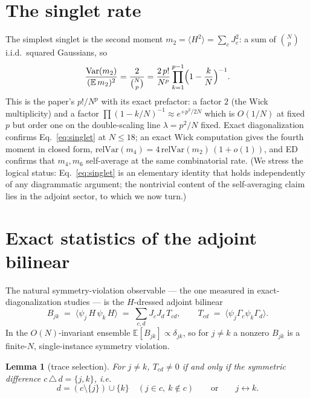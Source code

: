 \documentclass[11pt]{article}
\newtheorem{lemma}{Lemma}
\newcommand{\Var}{\operatorname{Var}}
\begin{document}
\section{The singlet rate}

The simplest singlet is the second moment
$m_2=\langle H^2\rangle=\sum_c J_c^2$: a sum of $\binom{N}{p}$ i.i.d.\
squared Gaussians, so
\begin{equation}
\frac{\Var(m_2)}{(\mathbb E\,m_2)^2}=\frac{2}{\binom{N}{p}}
=\frac{2\,p!}{N^p}\prod_{k=1}^{p-1}\Bigl(1-\frac kN\Bigr)^{-1}.
\label{eq:singlet}
\end{equation}
This is the paper's $p!/N^p$ with its exact prefactor: a factor $2$ (the Wick
multiplicity) and a factor $\prod(1-k/N)^{-1}\approx e^{+p^2/2N}$ which is
$O(1/N)$ at fixed $p$ but order one on the double-scaling line
$\lambda=p^2/N$ fixed. Exact diagonalization confirms
Eq.~\eqref{eq:singlet} at $N\le18$; an exact Wick computation gives the
fourth moment in closed form,
$\mathrm{relVar}(m_4)=4\,\mathrm{relVar}(m_2)\,(1+o(1))$, and ED confirms
that $m_4,m_6$ self-average at the same combinatorial rate.
(We stress the logical status: Eq.~\eqref{eq:singlet} is an elementary identity
that holds independently of any diagrammatic argument; the nontrivial content
of the self-averaging claim lies in the adjoint sector, to which we now turn.)

\section{Exact statistics of the adjoint bilinear}

The natural symmetry-violation observable --- the one measured in
exact-diagonalization studies --- is the $H$-dressed adjoint bilinear
\begin{equation}
B_{jk}\;=\;\bigl\langle \psi_j\,H\,\psi_k\,H\bigr\rangle
\;=\;\sum_{c,d}J_cJ_d\,T_{cd},
\qquad
T_{cd}\;=\;\bigl\langle\psi_j\Gamma_c\psi_k\Gamma_d\bigr\rangle .
\end{equation}
In the $O(N)$-invariant ensemble $\mathbb E[B_{jk}]\propto\delta_{jk}$, so for
$j\neq k$ a nonzero $B_{jk}$ is a finite-$N$, single-instance symmetry
violation.

\begin{lemma}[trace selection]\label{lem:selection}
For $j\neq k$, $T_{cd}\neq0$ if and only if the symmetric difference
$c\,\triangle\,d=\{j,k\}$, i.e.
\begin{equation}
d=(c\setminus\{j\})\cup\{k\}\quad(j\in c,\ k\notin c)
\qquad\text{or}\qquad j\leftrightarrow k .
\end{equation}
\end{lemma}
\end{document}
